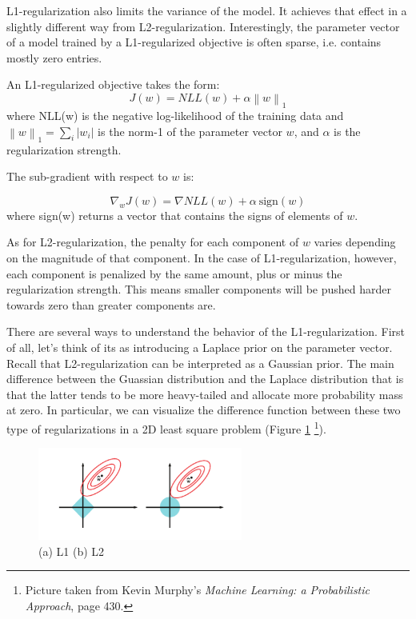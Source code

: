 \documentclass[11pt,letterpaper]{article}
\newcommand\norm[1]{\left\lVert#1\right\rVert}
\begin{document}
L1-regularization also limits the variance of the model. It achieves that effect in a slightly different way from L2-regularization. Interestingly, the parameter vector of a model trained by a L1-regularized objective is often sparse, i.e. contains mostly zero entries. 

An L1-regularized objective takes the form:
$$
J(w) = NLL(w) + \alpha \norm{w}_1
$$ where NLL(w) is the negative log-likelihood of the training data and $\norm{w}_1 = \sum_i |w_i|$ is the norm-1 of the parameter vector $w$, and $\alpha$ is the regularization strength.

The sub-gradient with respect to $w$ is:

$$ \nabla_w J(w) = \nabla NLL(w) + \alpha \ \text{sign}(w) $$ where sign(w) returns a vector that contains the signs of elements of $w$. 

As for L2-regularization, the penalty for each component of $w$ varies depending on the magnitude of that component. In the case of L1-regularization, however, each component is penalized by the same amount, plus or minus the regularization strength. This means smaller components will be pushed harder towards zero than greater components are.   

There are several ways to understand the behavior of the L1-regularization. First of all, let's think of its as introducing a Laplace prior on the parameter vector. Recall that L2-regularization can be interpreted as a Gaussian prior. The main difference between the Guassian distribution and the Laplace distribution that is that the latter tends to be more heavy-tailed and allocate more probability mass at zero. In particular, we can visualize the difference function between these two type of regularizations in a 2D least square problem (Figure \ref{fig:l1vsl2} \footnote{Picture taken from Kevin Murphy's \emph{Machine Learning: a Probabilistic Approach}, page 430.}).

\begin{figure}[H]
\centering
\includegraphics[width=0.6\textwidth]{l1vsl2.png}
\caption{(a) L1 (b) L2}
\label{fig:l1vsl2}
\end{figure}
\end{document}
